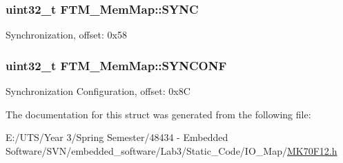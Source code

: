 \subsubsection[{S\+Y\+N\+C}]{\setlength{\rightskip}{0pt plus 5cm}uint32\+\_\+t F\+T\+M\+\_\+\+Mem\+Map\+::\+S\+Y\+N\+C}\label{struct_f_t_m___mem_map_a9537a55fae48de4811bfe7600d37b230}
Synchronization, offset\+: 0x58 \hypertarget{struct_f_t_m___mem_map_a3bd4b174127a80c7f8bd910b66e6de60}{}
\subsubsection[{S\+Y\+N\+C\+O\+N\+F}]{\setlength{\rightskip}{0pt plus 5cm}uint32\+\_\+t F\+T\+M\+\_\+\+Mem\+Map\+::\+S\+Y\+N\+C\+O\+N\+F}\label{struct_f_t_m___mem_map_a3bd4b174127a80c7f8bd910b66e6de60}
Synchronization Configuration, offset\+: 0x8\+C 

The documentation for this struct was generated from the following file\+:\begin{DoxyCompactItemize}
\item 
E\+:/\+U\+T\+S/\+Year 3/\+Spring Semester/48434 -\/ Embedded Software/\+S\+V\+N/embedded\+\_\+software/\+Lab3/\+Static\+\_\+\+Code/\+I\+O\+\_\+\+Map/\hyperlink{_m_k70_f12_8h}{M\+K70\+F12.\+h}\end{DoxyCompactItemize}
